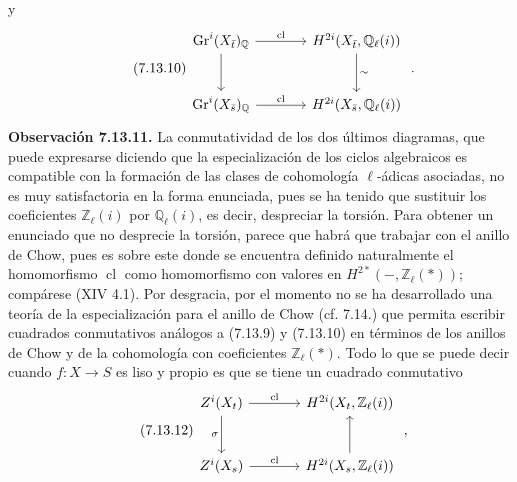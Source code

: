 y
\begin{equation}\tag{7.13.10}
\begin{tikzcd}[column sep=large,row sep=large]
\Gr^i(X_{\bar t})_{\mathbb Q} \arrow[r,"\operatorname{cl}"] \arrow[d] &
H^{2i}(X_{\bar t},\mathbb Q_\ell(i)) \arrow[d,"\sim"]\\
\Gr^i(X_{\bar s})_{\mathbb Q} \arrow[r,"\operatorname{cl}"] &
H^{2i}(X_{\bar s},\mathbb Q_\ell(i))
\end{tikzcd}
\;.
\end{equation}
\textbf{Observación 7.13.11.} La conmutatividad de los dos últimos diagramas, que puede expresarse diciendo que la especialización de los ciclos algebraicos es compatible con la formación de las clases de cohomología \(\ell\)-ádicas asociadas, no es muy satisfactoria en la forma enunciada, pues se ha tenido que sustituir los coeficientes \(\mathbb Z_\ell(i)\) por \(\mathbb Q_\ell(i)\), es decir, despreciar la torsión. Para obtener un enunciado que no desprecie la torsión, parece que habrá que trabajar con el anillo de Chow, pues es sobre este donde se encuentra definido naturalmente el homomorfismo \(\operatorname{cl}\) como homomorfismo con valores en \(H^{2*}(-,\mathbb Z_\ell(*))\); compárese (XIV 4.1). Por desgracia, por el momento no se ha desarrollado una teoría de la especialización para el anillo de Chow (cf. 7.14.) que permita escribir cuadrados conmutativos análogos a (7.13.9) y (7.13.10) en términos de los anillos de Chow y de la cohomología con coeficientes \(\mathbb Z_\ell(*)\). Todo lo que se puede decir cuando \(f:X\to S\) es liso y propio es que se tiene un cuadrado conmutativo
\begin{equation}\tag{7.13.12}
\begin{tikzcd}[column sep=large,row sep=large]
Z^i(X_t) \arrow[r,"\operatorname{cl}"] \arrow[d,"\sigma"'] &
H^{2i}(X_t,\mathbb Z_\ell(i))\\
Z^i(X_s) \arrow[r,"\operatorname{cl}"] &
H^{2i}(X_s,\mathbb Z_\ell(i)) \arrow[u]
\end{tikzcd}
\;,
\end{equation}
